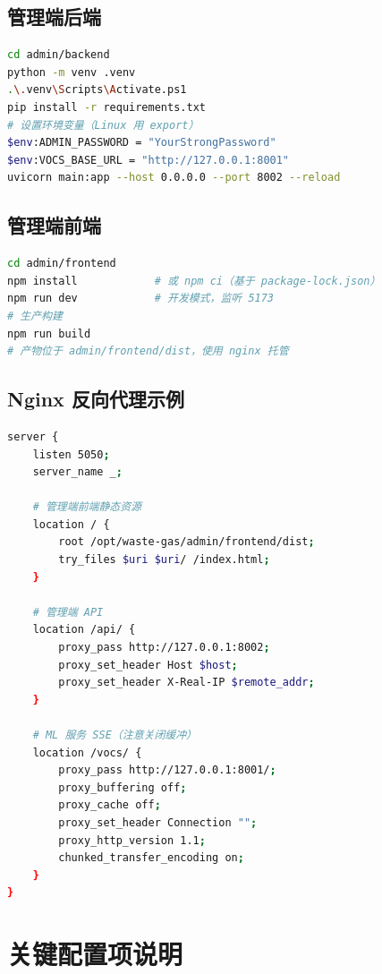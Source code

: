 \documentclass[UTF8,a4paper,11pt]{ctexart}
\begin{document}
\subsection{管理端后端}

\begin{lstlisting}[language=bash]
cd admin/backend
python -m venv .venv
.\.venv\Scripts\Activate.ps1
pip install -r requirements.txt
# 设置环境变量（Linux 用 export）
$env:ADMIN_PASSWORD = "YourStrongPassword"
$env:VOCS_BASE_URL = "http://127.0.0.1:8001"
uvicorn main:app --host 0.0.0.0 --port 8002 --reload
\end{lstlisting}

\subsection{管理端前端}

\begin{lstlisting}[language=bash]
cd admin/frontend
npm install            # 或 npm ci（基于 package-lock.json）
npm run dev            # 开发模式，监听 5173
# 生产构建
npm run build
# 产物位于 admin/frontend/dist，使用 nginx 托管
\end{lstlisting}

\subsection{Nginx 反向代理示例}

\begin{lstlisting}[language=bash]
server {
    listen 5050;
    server_name _;

    # 管理端前端静态资源
    location / {
        root /opt/waste-gas/admin/frontend/dist;
        try_files $uri $uri/ /index.html;
    }

    # 管理端 API
    location /api/ {
        proxy_pass http://127.0.0.1:8002;
        proxy_set_header Host $host;
        proxy_set_header X-Real-IP $remote_addr;
    }

    # ML 服务 SSE（注意关闭缓冲）
    location /vocs/ {
        proxy_pass http://127.0.0.1:8001/;
        proxy_buffering off;
        proxy_cache off;
        proxy_set_header Connection "";
        proxy_http_version 1.1;
        chunked_transfer_encoding on;
    }
}
\end{lstlisting}

\section{关键配置项说明}
\end{document}
